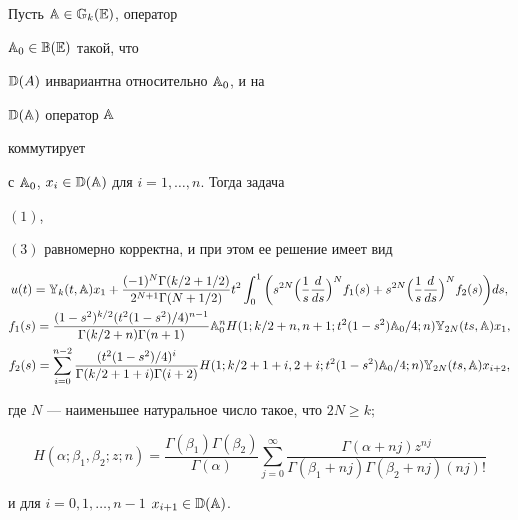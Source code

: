 \begin{thm} Пусть $\Bbb A\in\Bbb G_k(\Bbb E)$, оператор 


$\Bbb A_0\in\Bbb B(\Bbb E)$ такой, что 


$\Bbb D(A)$ инвариантна относительно $\Bbb A_0$, и на 


$\Bbb D(\Bbb A)$ оператор $\Bbb A$ 


коммутирует 


с $\Bbb A_0$, $x_i\in\Bbb D(\Bbb A)$ для $i=1,\dotsc,n$. Тогда задача 


$(1)$,  


$(3)$ равномерно корректна, и при этом ее решение имеет вид 


\begin{gather} 


u(t)=\Bbb Y_k(t,\Bbb A)x_1+ 


\frac{(-1)^N\Gamma(k/2+1/2)}{2^{N+1}\Gamma(N+1/2)}t^2 


\int^1_0\bigg(s^{2N}\Big(\frac{1}{s}\frac{d}{ds}\Big)^N f_1(s)+


s^{2N}\Big(\frac{1}{s}\frac{d}{ds}\Big)^N f_2(s)\bigg)ds, \\


% 


f_1(s)=\frac{(1-s^2)^{k/2}(t^2(1-s^2)/4)^{n-1}} 


{\Gamma(k/2+n)\Gamma(n+1)}\Bbb A^n_0 H 


(1;k/2+n,n+1;t^2(1-s^2)\Bbb A_0/4;n)\Bbb Y_{2N}(ts,\Bbb A)x_1,\notag \\


%


f_2(s)=\sum^{n-2}_{i=0}\frac{(t^2(1-s^2)/4)^i} 


{\Gamma(k/2+1+i)\Gamma(i+2)} 


H(1;k/2+1+i,2+i;t^2(1-s^2)\Bbb A_0/4;n) 


\Bbb Y_{2N}(ts,\Bbb A)x_{i+2},\notag


\end{gather} 


где $N$ --- наименьшее натуральное число такое, что $2N\ge k;$ 


\begin{equation} 


H(\alpha;\beta_1,\beta_2;z;n)= 


\frac{\Gamma(\beta_1)\Gamma(\beta_2)}{\Gamma(\alpha)} 


\sum^\infty_{j=0} 


\frac{\Gamma(\alpha+nj)z^{nj}} 


{\Gamma(\beta_1+nj)\Gamma(\beta_2+nj)(nj)!} 


\end{equation} 


и для $i=0,1,\dotsc,n-1$\; $x_{i+1}\in\Bbb D(\Bbb A)$. 


\end{thm} 


